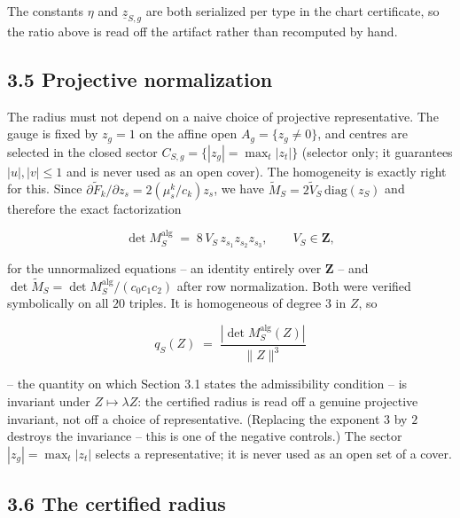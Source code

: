 The constants \(\eta\) and \(\underline{z}_{S,g}\) are both serialized per type in the chart certificate, so the ratio above is read off the artifact rather than recomputed by hand.

\subsection{3.5 Projective normalization}\label{projective-normalization}

The radius must not depend on a naive choice of projective representative. The gauge is fixed by \(z_g = 1\) on the affine open \(A_g = \{z_g \neq 0\}\), and centres are selected in the closed sector \(C_{S,g} = \{|z_g| = \max_t |z_t|\}\) (selector only; it guarantees \(|u|, |v| \le 1\) and is never used as an open cover). The homogeneity is exactly right for this. Since \(\partial \tilde F_k / \partial z_s = 2(\mu_s^k/c_k) z_s\), we have \(\tilde M_S = 2 \tilde V_S \, \mathrm{diag}(z_S)\) and therefore the exact factorization

\[\det M_S^{\mathrm{alg}} \;=\; 8\, V_S\, z_{s_1} z_{s_2} z_{s_3},
\qquad V_S \in \mathbf{Z},\]

for the unnormalized equations -- an identity entirely over \(\mathbf{Z}\) -- and \(\det \tilde M_S = \det M_S^{\mathrm{alg}} / (c_0 c_1 c_2)\) after row normalization. Both were verified symbolically on all \(20\) triples. It is homogeneous of degree \(3\) in \(Z\), so

\[q_S(Z) \;=\; \frac{|\det M_S^{\mathrm{alg}}(Z)|}{\lVert Z \rVert^3}\]

-- the quantity on which Section 3.1 states the admissibility condition -- is invariant under \(Z \mapsto \lambda Z\): the certified radius is read off a genuine projective invariant, not off a choice of representative. (Replacing the exponent \(3\) by \(2\) destroys the invariance -- this is one of the negative controls.) The sector \(|z_g| = \max_t |z_t|\) selects a representative; it is never used as an open set of a cover.

\subsection{3.6 The certified radius}\label{the-certified-radius}

